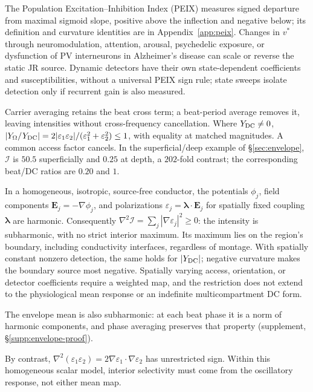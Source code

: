 \label{sec:opp}
The Population Excitation--Inhibition Index (PEIX) \cite{ruffini2025cfc}
measures signed departure from maximal sigmoid slope, positive above the
inflection and negative below; its definition and curvature identities are
in Appendix~\ref{app:peix}. Changes in $v^*$ through neuromodulation,
attention, arousal, psychedelic exposure, or dysfunction of PV interneurons
in Alzheimer's disease can scale or reverse the static JR source.
Dynamic detectors have their own state-dependent coefficients and susceptibilities, without
a universal PEIX sign rule; state sweeps isolate detection only if recurrent
gain is also measured.

Carrier averaging retains the beat cross term; a beat-period average removes
it, leaving intensities without cross-frequency cancellation. Where
$Y_{\rm DC}\ne0$,
$|Y_\Omega/Y_{\rm DC}|=2|\varepsilon_1\varepsilon_2|/
(\varepsilon_1^2+\varepsilon_2^2)\le1$, with equality at matched magnitudes.
A common access factor cancels. In the superficial/deep example of \S\ref{sec:envelope}, $\mathcal I$ is
$50.5$ superficially and $0.25$ at depth, a $202$-fold contrast;
the corresponding beat/DC ratios are $0.20$ and $1$.

In a homogeneous, isotropic, source-free conductor, the potentials $\phi_j$,
field components $\mathbf E_j=-\nabla\phi_j$, and polarizations
$\varepsilon_j=\boldsymbol\lambda\cdot\mathbf E_j$ for spatially fixed
coupling $\boldsymbol\lambda$ are harmonic. Consequently
$\nabla^2\mathcal I=\sum_j|\nabla\varepsilon_j|^2\ge0$:
the intensity is subharmonic, with no strict interior maximum. Its maximum
lies on the region's boundary, including conductivity interfaces, regardless
of montage. With spatially constant nonzero detection, the same holds for
$|Y_{\rm DC}|$; negative curvature makes the boundary source most negative.
Spatially varying access, orientation, or detector coefficients require a
weighted map, and the restriction does not extend to the physiological mean
response or an indefinite multicompartment DC form.

The envelope mean is also subharmonic: at each beat phase it is a norm of
harmonic components, and phase averaging preserves that property (supplement,
\S\ref{supp:envelope-proof}).
\ifjne\else

\fi
By contrast,
$\nabla^2(\varepsilon_1\varepsilon_2)=2\nabla\varepsilon_1\cdot\nabla\varepsilon_2$
has unrestricted sign. Within this homogeneous scalar model, interior
selectivity must come from the oscillatory response, not either mean map.

